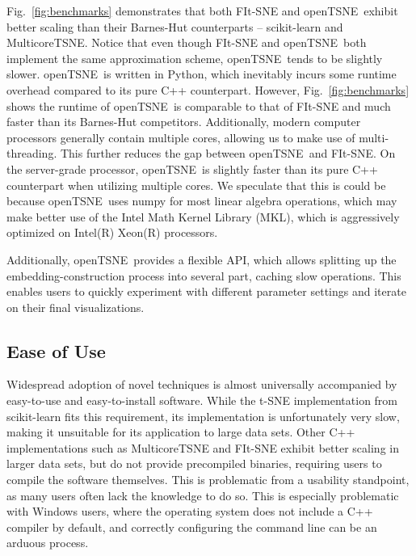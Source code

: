 \documentclass[twocolumn]{bmcart}
\newcommand{\opentsne}{\textsf{openTSNE}}
\begin{document}
Fig.~\ref{fig:benchmarks} demonstrates that both \textsf{FIt-SNE} and
\opentsne\ exhibit better scaling than their Barnes-Hut
counterparts -- \textsf{scikit-learn} and \textsf{MulticoreTSNE}. Notice that
even though \textsf{FIt-SNE} and \opentsne\ both implement the same
approximation scheme, \opentsne\ tends to be slightly slower. \opentsne\ is
written in Python, which inevitably incurs some runtime overhead compared to
its pure C++ counterpart. However, Fig.~\ref{fig:benchmarks} shows the
runtime of \opentsne\ is comparable to that of \textsf{FIt-SNE} and much faster
than its Barnes-Hut competitors. Additionally, modern computer processors
generally contain multiple cores, allowing us to make use of multi-threading.
This further reduces the gap between \opentsne\ and \textsf{FIt-SNE}. On the
server-grade processor, \opentsne\ is slightly faster than its pure C++
counterpart when utilizing multiple cores. We speculate that this is could be because \opentsne\ uses
\textsf{numpy} for most linear algebra operations, which may make better use of
the Intel Math Kernel Library (MKL), which is aggressively optimized on
Intel(R) Xeon(R) processors.

Additionally, \opentsne\ provides a flexible API, which allows splitting up the
embedding-construction process into several part, caching slow operations. This
enables users to quickly experiment with different parameter settings and
iterate on their final visualizations.

\subsection*{Ease of Use}

Widespread adoption of novel techniques is almost universally accompanied by
easy-to-use and easy-to-install software. While the t-SNE implementation from
\textsf{scikit-learn} fits this requirement, its implementation is
unfortunately very slow, making it unsuitable for its application to large data
sets. Other C++ implementations such as \textsf{MulticoreTSNE} and
\textsf{FIt-SNE} exhibit better scaling in larger data sets, but do not provide
precompiled binaries, requiring users to compile the software themselves. This
is problematic from a usability standpoint, as many users often lack the
knowledge to do so. This is especially problematic with Windows users, where
the operating system does not include a C++ compiler by default, and correctly
configuring the command line can be an arduous process.
\end{document}

